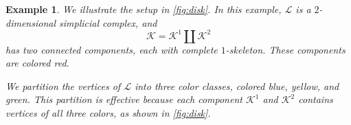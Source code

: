 \documentclass{article}
\newtheorem{example}{Example}[section]
\newcommand{\KK}{\mathcal{K}}
\newcommand{\LL}{\mathcal{L}}
\begin{document}
\begin{example}\label{ex:complete_skeleton}
We illustrate the setup in \cref{fig:disk}. In this example, $\LL$ is a
$2$-dimensional simplicial complex, and
\[
\KK = \KK^1 \coprod \KK^2
\]
has two connected components, each with complete $1$-skeleton. These components are colored red.

We partition the vertices of $\LL$ into three color classes, colored
blue, yellow, and green. This partition is effective because each
component $\KK^1$ and $\KK^2$ contains vertices of all three colors, as
shown in \cref{fig:disk}.

\begin{figure}[H]
    \centering


\end{figure}
\end{example}
\end{document}
